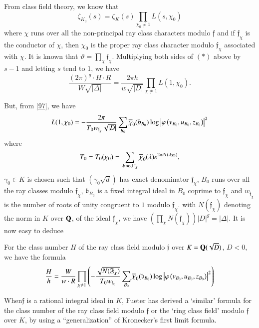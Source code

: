 From class field theory, we know that
\begin{equation*}
\zeta_{K_{0}}(s)=\zeta_{K}(s)\prod_{\chi_{0}\neq 1}L(s,\chi_{0})\tag{$\ast$}
\end{equation*}
where $\chi$ runs over all the non-principal ray class characters
modulo $\mathfrak{f}$ and if $\mathfrak{f}_{\chi}$ is the conductor of
$\chi$, then $\chi_{0}$ is the proper ray class character modulo
$\mathfrak{f}_{\chi}$ associated with $\chi$. It is known that
$\vartheta=\prod\limits_{\chi}\mathfrak{f}_{\chi}$. Multiplying both
sides of $(\ast)$ above by $s-1$ and letting $s$ tend to $1$, we have
$$
\frac{(2\pi)^{g}\cdot H\cdot R}{W\sqrt{|\Delta|}}=\frac{2\pi
  h}{w\sqrt{|D|}}\prod_{\chi\neq 1}L(1,\chi_{0}).
$$

But, from \eqref{97}, we have
$$
L(1,\chi_{0})=-\frac{2\pi}{T_{0}w_{\mathfrak{f}_{\chi}}\sqrt{|D|}}\sum_{B_{0}}\overline{\chi}_{0}(b_{B_{0}})\log\left|\varphi\left(v_{B_{0}},u_{B_{0}},z_{B_{0}}\right)\right|^{2} 
$$
where
$$
T_{0}=T_{0}(\chi_{0})=\sum_{\lambda\rm{mod} \;\mathfrak{f}_{\chi}}\overline{\chi}_{0}(\lambda)e^{2\pi
  iS(\lambda\gamma_{0})},
$$
$\gamma_{0}\in K$ is chosen such that $(\gamma_{0}\sqrt{d})$ has exact
denominator $\mathfrak{f}_{\chi}$, $B_{0}$ runs over all the ray
classes modulo $\mathfrak{f}_{\chi}$, $\mathfrak{b}_{B_{0}}$ is a
fixed integral ideal in $B_{0}$ coprime to $\mathfrak{f}_{\chi}$ and
$w_{\mathfrak{f}_{\chi}}$ is the number of roots of unity congruent to
$1$ modulo $\mathfrak{f}_{\chi}$. with $N(\mathfrak{f}_{\chi})$
denoting the norm in $K$ over $\mathbf{Q}$, of the ideal
$\mathfrak{f}_{\chi}$, we have
$(\prod\limits_{\chi}N(\mathfrak{f}_{\chi}))|D|^{g}=|\Delta|$. It is
now easy to deduce

\begin{thm}\label{thm10}
For the class number $H$ of the ray class field modulo $\mathfrak{f}$
over $K=\mathbf{Q}(\sqrt{D})$, $D<0$, we have the formula
$$
\frac{H}{h}=\frac{W}{w\cdot R}\prod_{\chi\neq 1}\left(-\frac{\sqrt{N(\mathfrak{F}_{\chi})}}{T_{0}w_{\mathfrak{f}_{\chi}}}\sum_{B_{0}}\overline{\chi}_{0}(\mathfrak{b}_{B_{0}})\log\left|\varphi\left(v_{B_{0}},u_{B_{0}},z_{B_{0}}\right)\right|^{2}\right)
$$
\end{thm}

When\pageoriginale $\mathfrak{f}$ is a rational integral ideal in $K$,
Fueter has derived a `similar' formula for the class number of the ray
class field modulo $\mathfrak{f}$ or the `ring class field' modulo
$\mathfrak{f}$ over $K$, by using a ``generalization'' of Kronecker's
first limit formula.

